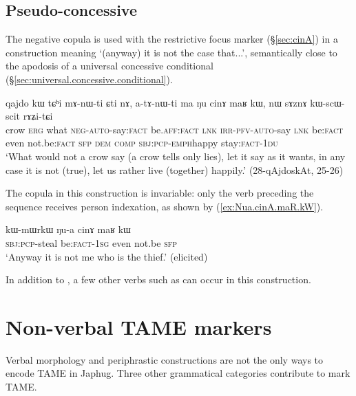 \subsection{Pseudo-concessive} \label{sec:cinAmaRkW}
The negative copula  is used with the restrictive focus marker  (§\ref{sec:cinA}) in a construction meaning `(anyway) it is not the case that...', semantically close to the apodosis of a universal concessive conditional (§\ref{sec:universal.concessive.conditional}).


\begin{exe}
	\ex \label{ex:Nu.cinA.maR.kW}
	\gll qajdo kɯ tɕʰi mɤ-nɯ-ti ɕti nɤ, a-tɤ-nɯ-ti ma ŋu cinɤ maʁ kɯ, nɯ sɤznɤ kɯ-scɯ-scit rɤʑi-tɕi \\
	crow \textsc{erg} what \textsc{neg}-\textsc{auto}-say:\textsc{fact} be.\textsc{aff}:\textsc{fact} \textsc{lnk} \textsc{irr}-\textsc{pfv}-\textsc{auto}-say \textsc{lnk} be:\textsc{fact} even not.be:\textsc{fact} \textsc{sfp} \textsc{dem} \textsc{comp} \textsc{sbj}:\textsc{pcp}-\textsc{emph}\redp{}happy stay:\textsc{fact}-\textsc{1du} \\
	\glt `What would not a crow say (a crow tells only lies), let it say as it wants, in any case it is not (true), let us rather live (together) happily.' (28-qAjdoskAt, 25-26)
\end{exe} 

The copula  in this construction is invariable: only the verb preceding the  sequence receives person indexation, as shown by (\ref{ex:Nua.cinA.maR.kW}).  

\begin{exe}
	\ex \label{ex:Nua.cinA.maR.kW}
	\gll  kɯ-mɯrkɯ ŋu-a cinɤ maʁ kɯ  \\
	\textsc{sbj}:\textsc{pcp}-steal be:\textsc{fact}-\textsc{1sg} even not.be \textsc{sfp} \\
	\glt `Anyway it is not me who is the thief.' (elicited)
\end{exe}

In addition to , a few other verbs such as  can occur in this construction.

\section{Non-verbal TAME markers}  \label{sec:non.verb.TAME}
Verbal morphology and periphrastic constructions are not the only ways to encode TAME in Japhug. Three other grammatical categories contribute to mark TAME. 


